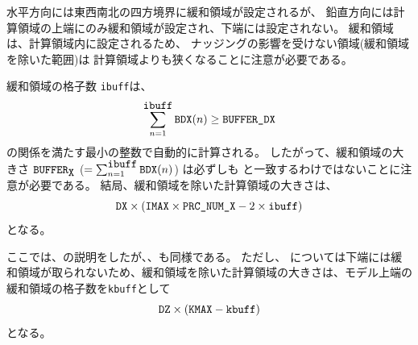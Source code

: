 ~\\
 \\
 \\
~\\

\\


%
水平方向には東西南北の四方境界に緩和領域が設定されるが、
鉛直方向には計算領域の上端にのみ緩和領域が設定され、下端には設定されない。
緩和領域は、計算領域内に設定されるため、
ナッジングの影響を受けない領域(緩和領域を除いた範囲)は
計算領域よりも狭くなることに注意が必要である。

緩和領域の格子数 \verb|ibuff|は、
\[
\sum_{n=1}^{\verb|ibuff|} \verb|BDX|(n) \ge \nmitemeq{BUFFER_DX} \nonumber
\]
の関係を満たす最小の整数で自動的に計算される。
したがって、緩和領域の大きさ $\verb|BUFFER|_{\verb|X|}$ ($= \sum_{n=1}^{\verb|ibuff|} \verb|BDX|(n)$)
は必ずしも  と一致するわけではないことに注意が必要である。
結局、緩和領域を除いた計算領域の大きさは、
\[
\nmitemeq{DX} \times ( \nmitemeq{IMAX} \times \nmitemeq{PRC_NUM_X} - 2 \times \verb|ibuff| )
\]
となる。

ここでは、{\XDIR}の説明をしたが、{\YDIR}、{\ZDIR}も同様である。
ただし、{\ZDIR} については下端には緩和領域が取られないため、緩和領域を除いた計算領域の大きさは、モデル上端の緩和領域の格子数を\verb|kbuff|として
\[
\nmitemeq{DZ} \times ( \nmitemeq{KMAX} - \verb|kbuff| )
\]
となる。


